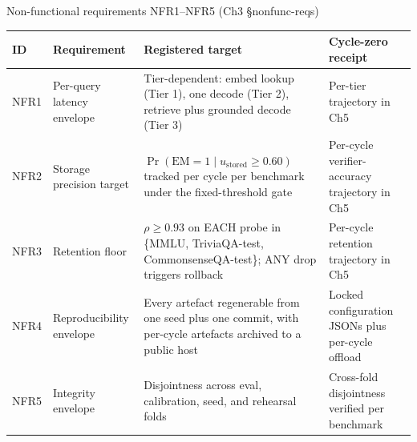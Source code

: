\documentclass[10pt,aspectratio=169]{beamer}
\begin{document}
\begin{frame}{Non-functional requirements NFR1--NFR5 (Ch3 \S nonfunc-reqs)}
  \scriptsize
  \begin{tabular}{@{}p{0.6cm}p{3.5cm}p{4cm}p{4.5cm}@{}}
    \toprule
    \textbf{ID} & \textbf{Requirement} & \textbf{Registered target} & \textbf{Cycle-zero receipt} \\
    \midrule
    NFR1 & Per-query latency envelope & Tier-dependent: embed lookup (Tier 1), one decode (Tier 2), retrieve plus grounded decode (Tier 3) & Per-tier trajectory in Ch5 \\
    NFR2 & Storage precision target & $\Pr(\mathrm{EM}{=}1\mid u_{\text{stored}}\!\ge\!0.60)$ tracked per cycle per benchmark under the fixed-threshold gate & Per-cycle verifier-accuracy trajectory in Ch5 \\
    NFR3 & Retention floor & $\rho \ge 0.93$ on EACH probe in \{MMLU, TriviaQA-test, CommonsenseQA-test\}; ANY drop triggers rollback & Per-cycle retention trajectory in Ch5 \\
    NFR4 & Reproducibility envelope & Every artefact regenerable from one seed plus one commit, with per-cycle artefacts archived to a public host & Locked configuration JSONs plus per-cycle offload \\
    NFR5 & Integrity envelope & Disjointness across eval, calibration, seed, and rehearsal folds & Cross-fold disjointness verified per benchmark \\
    \bottomrule
  \end{tabular}
\end{frame}
\end{document}
